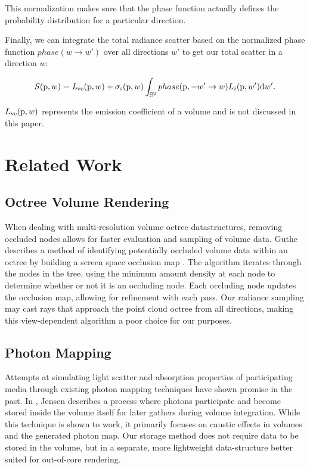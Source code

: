\documentclass[runningheads]{llncs}
\begin{document}
This normalization makes sure that the phase function actually defines the probability distribution for a particular direction.

Finally, we can integrate the total radiance scatter based on the normalized phase function $phase(w \to w')$ over all directions $w$' to get our total scatter in a direction $w$:

\begin{displaymath}
\mathit{S}(\textup{p},w) = \mathit{L}_{\textup{ve}}(\textup{p},w) + \sigma_{\textup{s}}(\textup{p}, w) \int_{\mathbb{S}^2} phase(\textup{p}, -w' \to w) L_{i}(\textup{p},w')\textup{d}w'.
\end{displaymath}

$L_{\textup{ve}}(\textup{p}, w)$ represents the emission coefficient of a volume and is not discussed in this paper.


\section{Related Work}

\subsection{Octree Volume Rendering}
When dealing with multi-resolution volume octree datastructures, removing occluded nodes allows for faster evaluation and sampling of volume data.  Guthe describes a method of identifying potentially occluded volume data within an octree by building a screen space occlusion map \cite{guthe}.  The algorithm iterates through the nodes in the tree, using the minimum amount density at each node to determine whether or not it is an occluding node.  Each occluding node updates the occlusion map, allowing for refinement with each pass.  Our radiance sampling may cast rays that approach the point cloud octree from all directions, making this view-dependent algorithm a poor choice for our purposes.

\subsection{Photon Mapping}
Attempts at simulating light scatter and absorption properties of participating media through existing photon mapping techniques have shown promise in the past.  In \cite{jensen:1998}, Jensen describes a process where photons participate and become stored inside the volume itself for later gathers during volume integration.  While this technique is shown to work, it primarily focuses on caustic effects in volumes and the generated photon map.  Our storage method does not require data to be stored in the volume, but in a separate, more lightweight data-structure better suited for out-of-core rendering.
\end{document}
